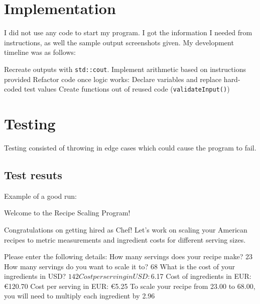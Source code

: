 \documentclass[12pt, letterpaper]{article}
\begin{document}
\section{Implementation}
I did not use any code to start my program. I got the information I needed from instructions, as well the sample output screenshots given. My development timeline was as follows:
\begin{outline}[enumerate]
    \1 Recreate outputs with \texttt{std::cout}.
    \1 Implement arithmetic based on instructions provided
    \1 Refactor code once logic works:
        \2 Declare variables and replace hard-coded test values 
        \2 Create functions out of reused code (\texttt{validateInput()})
\end{outline} 
\section{Testing}
Testing consisted of throwing in edge cases which could cause the program to fail.
\noindent
\begin{center}
    \subsection*{Test resuts}
    Example of a good run:
\begin{MyVerbatim}
Welcome to the Recipe Scaling Program!

Congratulations on getting hired as Chef!
Let's work on scaling your American recipes to metric measurements and ingredient costs for different serving sizes.

Please enter the following details:
How many servings does your recipe make? 23 
How many servings do you want to scale it to? 68
What is the cost of your ingredients in USD? $142

Cost per serving in USD:      $6.17
Cost of ingredients in EUR:   €120.70
Cost per serving in EUR:      €5.25
To scale your recipe from 23.00 to 68.00, you will need to multiply each ingredient by 2.96
\end{MyVerbatim}
\end{center}
\pagebreak
\end{document}
